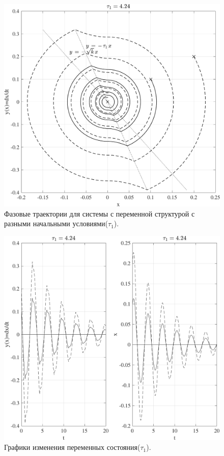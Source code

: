 \begin{figure}[!h]\centering
\includegraphics[width=0.7\linewidth]{images/variable_structure2_tau1}
\caption{ Фазовые траектории для системы с переменной структурой с разными начальными условиями($\tau_1$).}\label{fig:variable_structure2_tau1}
\end{figure}
\begin{figure}[!h]\centering
\includegraphics[width=0.7\linewidth]{images/variable_structure2_sys_tau1}
\caption{ Графики изменения переменных состояния($\tau_1$).}\label{fig:variable_structure2_sys_tau1}
\end{figure}
